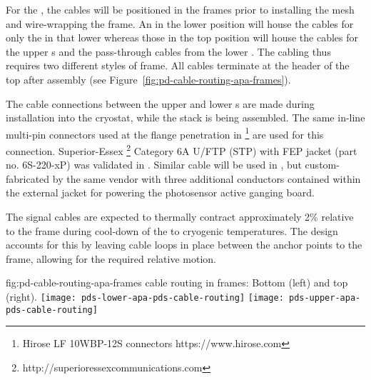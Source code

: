 For the , the  cables will be %
positioned in the  frames prior to installing the %
mesh and wire-wrapping the frame.  %
An  in the lower position will house the cables for only the  in that lower  whereas those in the top position will house the cables for the upper  s and the pass-through cables from the lower . The cabling thus requires two different styles of  frame. All cables terminate at the header of the top  after assembly (see Figure~\ref{fig:pd-cable-routing-apa-frames}).

The cable connections between the upper and lower s are made during  installation into the cryostat, while the  stack is being assembled. The same in-line multi-pin connectors used at the flange penetration in \footnote{Hirose LF 10WBP-12S connectors https://www.hirose.com} are used for this connection.  Superior-Essex \footnote{http://superioressexcommunications.com} Category 6A U/FTP (STP) with FEP jacket (part no. 6S-220-xP) was validated in .  Similar cable will be used in , but custom-fabricated by the same vendor with three additional conductors contained within the external jacket for powering the photosensor active ganging board.


The  signal cables are expected to thermally contract approximately 2\% relative to the  frame during cool-down of the  to cryogenic temperatures.  The design accounts for this by leaving cable loops in place between the anchor points to the  frame, allowing for the required relative motion.


\begin{dunefigure}
{fig:pd-cable-routing-apa-frames}
{ cable routing in  frames: Bottom  (left) and top  (right).}
	\texttt{[image: pds-lower-apa-pds-cable-routing]}
	\texttt{[image: pds-upper-apa-pds-cable-routing]}
	\vspace{-1.5cm}
\end{dunefigure}

